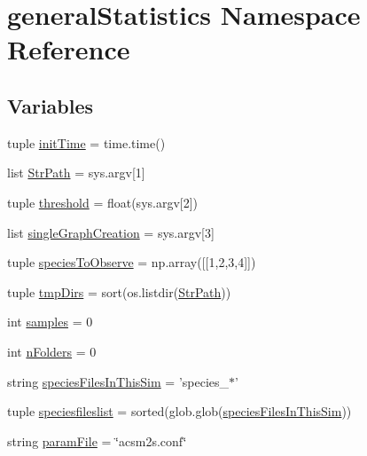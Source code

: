 \hypertarget{namespacegeneral_statistics}{\section{general\-Statistics \-Namespace \-Reference}
\label{namespacegeneral_statistics}
}
\subsection*{\-Variables}
\begin{DoxyCompactItemize}
\item 
tuple \hyperlink{namespacegeneral_statistics_aa46cfad394454af6b0edb80b804912c4}{init\-Time} = time.\-time()
\item 
list \hyperlink{namespacegeneral_statistics_a6f9e03e2d193c637dbe6f1f499a2f2ca}{\-Str\-Path} = sys.\-argv\mbox{[}1\mbox{]}
\item 
tuple \hyperlink{namespacegeneral_statistics_a155d64c28850cab0f82a1476f73c376d}{threshold} = float(sys.\-argv\mbox{[}2\mbox{]})
\item 
list \hyperlink{namespacegeneral_statistics_ab5f0084f0bffc62955b6478be2d9c9b2}{single\-Graph\-Creation} = sys.\-argv\mbox{[}3\mbox{]}
\item 
tuple \hyperlink{namespacegeneral_statistics_acfada06fea0c10e3f1eea8b9cdde37e3}{species\-To\-Observe} = np.\-array(\mbox{[}\mbox{[}1,2,3,4\mbox{]}\mbox{]})
\item 
tuple \hyperlink{namespacegeneral_statistics_aab694ae45f6a40a105eee68bffad9bc2}{tmp\-Dirs} = sort(os.\-listdir(\hyperlink{namespacegeneral_statistics_a6f9e03e2d193c637dbe6f1f499a2f2ca}{\-Str\-Path}))
\item 
int \hyperlink{namespacegeneral_statistics_a0f3c6fa133cfbef06ffd82dfbef8ace4}{samples} = 0
\item 
int \hyperlink{namespacegeneral_statistics_ad418d91181efd01508f2b136166cd854}{n\-Folders} = 0
\item 
string \hyperlink{namespacegeneral_statistics_abb8208696dc18d1afb27e8c01a0c0a58}{species\-Files\-In\-This\-Sim} = 'species\-\_\-$\ast$'
\item 
tuple \hyperlink{namespacegeneral_statistics_aa0ecc1dfa89ff9c9f241affd61ada255}{speciesfileslist} = sorted(glob.\-glob(\hyperlink{namespacegeneral_statistics_abb8208696dc18d1afb27e8c01a0c0a58}{species\-Files\-In\-This\-Sim}))
\item 
string \hyperlink{namespacegeneral_statistics_a84a4d4e74b9c4bceedf625a578c8ddec}{param\-File} = \char`\"{}acsm2s.\-conf\char`\"{}

\end{DoxyCompactItemize}
